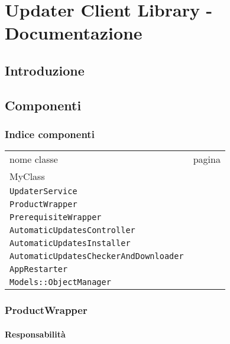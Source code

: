 \section{Updater Client Library - Documentazione}
		\label{sec:UpdaterClientLibrary}
		
			\subsection{Introduzione}
			
			
			\subsection{Componenti}
			
				\subsubsection{Indice componenti}
				
				\begin{tabular}{lc}
					nome classe & pagina \\
					MyClass & \pageref{MyClass} \\
					\verb|UpdaterService| & \pageref{} \\
					\verb|ProductWrapper| & \pageref{} \\
					\verb|PrerequisiteWrapper| & \pageref{} \\
					\verb|AutomaticUpdatesController| & \pageref{} \\
					\verb|AutomaticUpdatesInstaller| & \pageref{} \\
					\verb|AutomaticUpdatesCheckerAndDownloader| & \pageref{} \\
					\verb|AppRestarter| & \pageref{} \\
					\verb|Models::ObjectManager| & \pageref{} \\
				
				\end{tabular}
				
				\subsubsection{ProductWrapper}

					\begin{figure}
					\end{figure}									
				
					\paragraph{Responsabilità}
					
